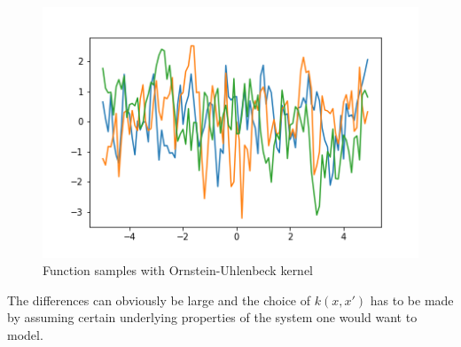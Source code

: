         \begin{figure}[ht]
        \centering
        \includegraphics[width=.9\linewidth]{SoM_report_template/figures/priorornstein.png}
        \caption[Prior with Ornstein-Uhlenbeck kernel]{\label{f:ornstein_prior}Function samples with Ornstein-Uhlenbeck kernel}
    \end{figure}
    \newline
    The differences can obviously be large and the choice of $k(x,x')$ has to be made by assuming certain underlying properties of the system one would want to model. \newline
    
